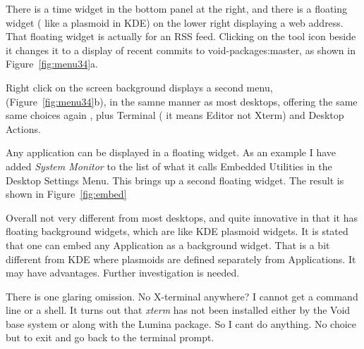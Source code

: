 \documentclass{article}  %
\begin{document}
There is a time widget in the bottom panel at the right, and there is a floating widget ( like a plasmoid in KDE) on the lower right displaying a web address. That floating widget is actually for an RSS feed. Clicking on the tool icon beside it changes it to a display of recent commits to void-packages:master, as shown in Figure~\ref{fig:menu34}a.

 Right click on the screen background displays a second menu, (Figure~\ref{fig:menu34}b),  in the samne manner as most desktops, offering the same same choices again , plus Terminal ( it means Editor not Xterm) and Desktop Actions.


 Any application can be displayed in a floating widget. As an example I have added {\em System Monitor} to the list of what it calls Embedded Utilities in the Desktop Settings Menu. This brings up a second floating widget. The result is shown in Figure~\ref{fig:embed}



Overall not very different from most desktops, and quite innovative in that it has floating background widgets, which are like KDE plasmoid widgets. It is stated that one can embed any Application as a background widget. That is a bit different from KDE where plasmoids are defined separately from Applications. It may have advantages. Further investigation is needed. 

 There is one glaring omission. No X-terminal anywhere? I cannot get a command line or a shell. It turns out that {\em xterm} has not been installed either by the Void base system or along with the Lumina package.  So I cant do anything. No choice but to exit and go back to the terminal prompt. 


\clearpage
\end{document}
